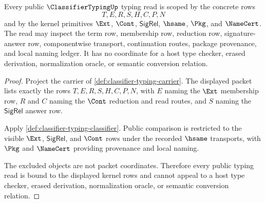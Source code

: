 \begin{theorem}
\label{thm:classifiertyping-kernel-scope-binding}
Every public $\ClassifierTypingUp$ typing read is scoped by the concrete rows
$$
T,E,R,S,H,C,P,N
$$
and by the kernel primitives $\Ext$, $\Cont$, $\mathsf{SigRel}$, $\hsame$, $\Pkg$, and $\NameCert$. The read may inspect the term row, membership row, reduction row, signature-answer row, componentwise transport, continuation routes, package provenance, and local naming ledger. It has no coordinate for a host type checker, erased derivation, normalization oracle, or semantic conversion relation.
\end{theorem}
\begin{proof}
Project the carrier of \autoref{def:classifier-typing-carrier}. The displayed packet lists exactly the rows $T,E,R,S,H,C,P,N$, with $E$ naming the $\Ext$ membership row, $R$ and $C$ naming the $\Cont$ reduction and read routes, and $S$ naming the $\mathsf{SigRel}$ answer row.

Apply \autoref{def:classifier-typing-classifier}. Public comparison is restricted to the visible $\Ext$, $\mathsf{SigRel}$, and $\Cont$ rows under the recorded $\hsame$ transports, with $\Pkg$ and $\NameCert$ providing provenance and local naming.

The excluded objects are not packet coordinates. Therefore every public typing read is bound to the displayed kernel rows and cannot appeal to a host type checker, erased derivation, normalization oracle, or semantic conversion relation.
\end{proof}

